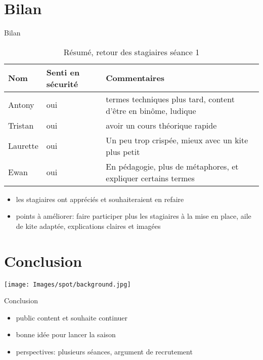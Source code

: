 \documentclass[10pt,a4paper]{beamer}
\begin{document}
\section{Bilan}
\begin{frame}{Bilan}
\begin{table}[h]
\begin{tabular}{|p{1cm}|p{2cm}|p{6cm}|}
        \hline
        \textbf{Nom} & \textbf{Senti en sécurité} & \textbf{Commentaires} \\ 
        \hline
       Antony      &  oui    &   termes techniques plus tard, content d’être en binôme, ludique         \\
       \hline
       Tristan     &  oui    & avoir un cours théorique rapide  \\
       \hline
        Laurette   &  oui    & Un peu trop crispée, mieux avec un kite plus petit \\
        \hline
        Ewan       &  oui    & En pédagogie, plus de métaphores, et expliquer certains termes\\
        \hline
\end{tabular}
\caption{Résumé, retour des stagiaires séance 1\label{stagiaire_feedback}}
\end{table}
\begin{itemize}
\item les stagiaires ont appréciés et souhaiteraient en refaire
\item points à améliorer: faire participer plus les stagiaires à la mise en place, 
aile de kite adaptée, explications claires et imagées
\end{itemize}
\end{frame}

\section{Conclusion}
{
{
   \texttt{[image: Images/spot/background.jpg]}
}

\begin{frame}{Conclusion}
\begin{itemize}
\item public content et souhaite continuer
\item bonne idée pour lancer la saison
\item perspectives: plusieurs séances, argument de recrutement 
\end{itemize}
\end{frame}
}
\end{document}
